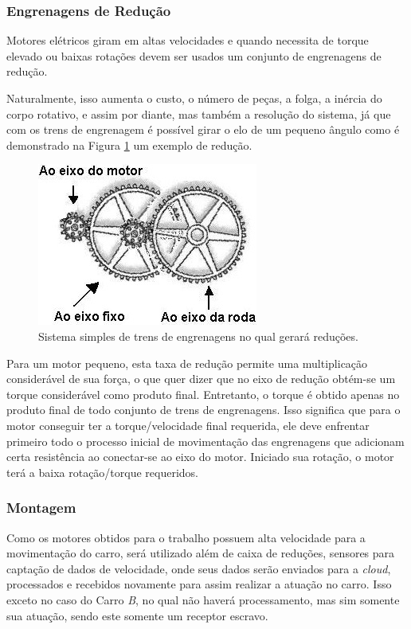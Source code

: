 \documentclass[portugues, brazil, a4paper,12pt]{article}
\begin{document}
		\subsubsection{Engrenagens de Redução}
			Motores elétricos giram em altas velocidades e quando necessita de torque elevado ou baixas rotações devem ser usados um conjunto de engrenagens de redução. 

			Naturalmente, isso aumenta o custo, o número de peças, a folga, a inércia do corpo rotativo, e assim por diante, mas também a resolução do sistema, já que com os trens de engrenagem é possível girar o elo de um pequeno ângulo como é demonstrado na Figura \ref{fig:reducao} um exemplo de redução.

			\begin{figure}[h]
				\centering
				\includegraphics[width=0.5\linewidth]{img/math-reducao.jpg}
				\caption{Sistema simples de trens de engrenagens no qual gerará reduções.}
				\label{fig:reducao}
			\end{figure}

			Para um motor pequeno, esta taxa de redução permite uma multiplicação considerável de sua força, o que quer dizer que no eixo de redução obtém-se um torque considerável como produto final. Entretanto, o torque é obtido apenas no produto final de todo conjunto de trens de engrenagens. Isso significa que para o motor conseguir ter a torque/velocidade final requerida, ele deve enfrentar primeiro todo o processo inicial de movimentação das engrenagens que adicionam certa resistência ao conectar-se ao eixo do motor. Iniciado sua rotação, o motor terá a baixa rotação/torque requeridos.


		\subsubsection{Montagem}
			Como os motores obtidos para o trabalho possuem alta velocidade para a movimentação do carro, será utilizado além de caixa de reduções, sensores para captação de dados de velocidade, onde seus dados serão enviados para a \textit{cloud}, processados e recebidos novamente para assim realizar a atuação no carro. Isso exceto no caso do Carro \textit{B}, no qual não haverá processamento, mas sim somente sua atuação, sendo este somente um receptor escravo.
\end{document}
